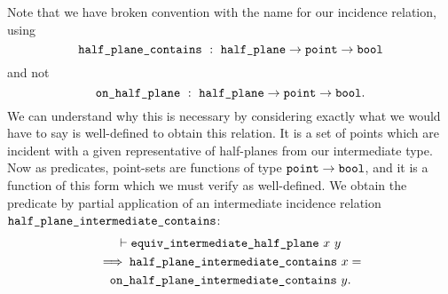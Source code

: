 Note that we have broken convention with the name for our incidence relation, using 
\begin{displaymath}
\code{half\_plane\_contains}\ :\ \code{half\_plane}\rightarrow\code{point}\rightarrow\code{bool}
\end{displaymath}
and not 
\begin{displaymath}
\code{on\_half\_plane}\ :\ \code{half\_plane}\rightarrow\code{point}\rightarrow\code{bool}.
\end{displaymath}
We can understand why this is necessary by considering exactly what we would have to say is well-defined to obtain this relation. It is a set of points which are incident with a given representative of half-planes from our intermediate type. Now as predicates, point-sets are functions of type $\texttt{point} \rightarrow \texttt{bool}$, and it is a function of this form which we must verify as well-defined. We obtain the predicate by partial application of an intermediate incidence relation $\texttt{half\_plane\_intermediate\_contains}$:
\begin{multline*}
\vdash\texttt{equiv\_intermediate\_half\_plane}\ x\ y \\
\implies \texttt{half\_plane\_intermediate\_contains}\ x =\\ \texttt{on\_half\_plane\_intermediate\_contains}\ y.
\end{multline*}

